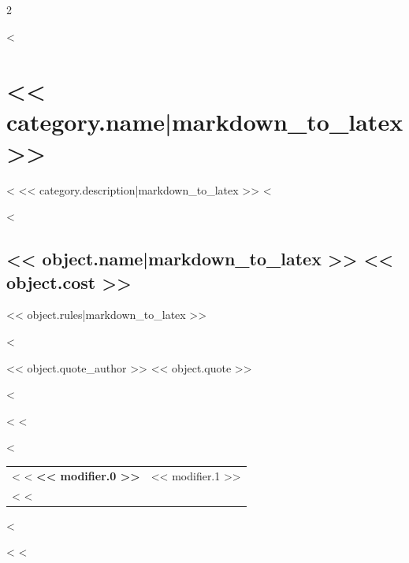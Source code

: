 \label{ch:appendix-templates}

\begin{multicols}{2}

<%
\section{<< category.name|markdown_to_latex >>}

<%
<< category.description|markdown_to_latex >>
<%

<%
\begin{tcolorbox}
    \subsection*{<< object.name|markdown_to_latex >> \hfill \small{<< object.cost >> }}
    \tcblower
<< object.rules|markdown_to_latex >>

<%
\begin{pquote}{<< object.quote_author >>}
<< object.quote >>
\end{pquote}
<%

<%
\vspace{3mm}
<%

<%
\begin{tabular}{@{}ll@{}}
    <%
    <%
    \textbf{<< modifier.0 >>} & << modifier.1 >>\\
    <%
    <%
\end{tabular}
<%


\end{tcolorbox}

<%
<%
\end{multicols}
